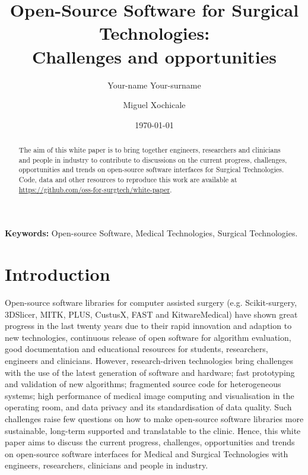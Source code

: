 \documentclass{article}
\title{
Open-Source Software for Surgical Technologies: \\ Challenges and opportunities
}
\author[3]{Your-name Your-surname}
\affil[3]{Your Affiliation}
\author[1, 2]{Miguel Xochicale}
\affil[2]{ARC, University College London}
\affil[1]{WEISS, University College London}
\date{
\today
}
\begin{document}
\maketitle

\begin{abstract}
The aim of this white paper is to bring together engineers, researchers and clinicians and people in industry to contribute to discussions on the current progress, challenges, opportunities and trends on open-source software interfaces for Surgical Technologies.
Code, data and other resources to reproduce this work are available at \url{https://github.com/oss-for-surgtech/white-paper}.
\end{abstract}

\textbf{Keywords:} Open-source Software, Medical Technologies, Surgical Technologies.


\section{Introduction}
Open-source software libraries for computer assisted surgery (e.g. Scikit-surgery, 3DSlicer, MITK, PLUS, CustusX, FAST and KitwareMedical) have shown great progress in the last twenty years due to their rapid innovation and adaption to new technologies, continuous release of open software for algorithm evaluation, good documentation and educational resources for students, researchers, engineers and clinicians.
However, research-driven technologies bring challenges with the use of the latest generation of software and hardware; fast prototyping and validation of new algorithms; fragmented source code for heterogeneous systems; high performance of medical image computing and visualisation in the operating room, and data privacy and its standardisation of data quality.
Such challenges raise few questions on how to make open-source software libraries more sustainable, long-term supported and translatable to the clinic. 
Hence, this white paper aims to discuss the current progress, challenges, opportunities and trends on open-source software interfaces for Medical and Surgical Technologies with engineers, researchers, clinicians and people in industry.

\end{document}

